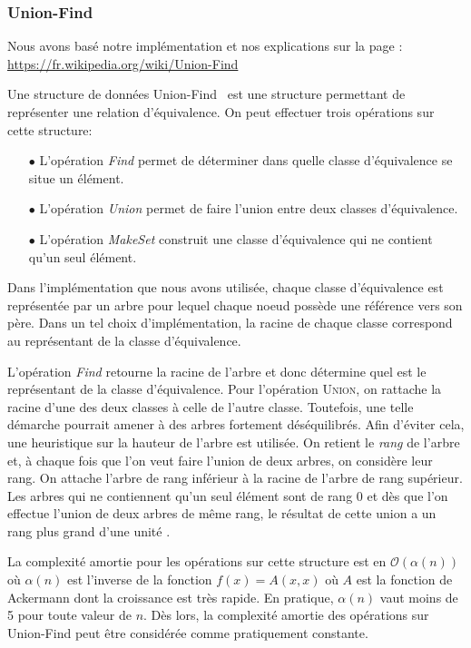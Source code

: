 \subsubsection{Union-Find}
\label{section:unionFind}

Nous avons basé notre implémentation et nos explications sur la page : \url{https://fr.wikipedia.org/wiki/Union-Find}

Une structure de données \og Union-Find \fg~est une structure permettant de représenter une relation d'équivalence. On peut effectuer trois opérations sur cette structure:
\begin{itemize}
\item[$\bullet$] L'opération \emph{Find} permet de déterminer dans quelle classe d'équivalence se situe un élément.
\item[$\bullet$] L'opération \emph{Union} permet de faire l'union entre deux classes d'équivalence.
\item[$\bullet$] L'opération \emph{MakeSet} construit une classe d'équivalence qui ne contient qu'un seul élément.
\end{itemize}

Dans l'implémentation que nous avons utilisée, chaque classe d'équivalence est représentée par un arbre pour lequel chaque noeud possède une référence vers son père. Dans un tel choix d'implémentation, la racine de chaque classe correspond au représentant de la classe d'équivalence.

L'opération \emph{Find} retourne la racine de l'arbre et donc détermine quel est le représentant de la classe d'équivalence. Pour l'opération \textsc{Union}, on rattache la racine d'une des deux classes à celle de l'autre classe. Toutefois, une telle démarche pourrait amener à des arbres fortement déséquilibrés. Afin d'éviter cela, une heuristique sur la hauteur de l'arbre est utilisée. On retient le \emph{rang} de l'arbre et, à chaque fois que l'on veut faire l'union de deux arbres, on considère leur rang. On attache l'arbre de rang inférieur à la racine de l'arbre de rang supérieur. Les arbres qui ne contiennent qu'un seul élément sont de rang 0 et dès que l'on effectue l'union de deux arbres de même rang, le résultat de cette union a un rang plus grand d'une unité .

La complexité amortie pour les opérations sur cette structure  est en $\mathcal{O}(\alpha (n))$ où $\alpha(n)$ est l'inverse de la fonction $f(x) = A(x,x)$ où $A$ est la fonction de Ackermann dont la croissance est très rapide. En pratique, $\alpha(n)$ vaut moins de 5 pour toute valeur de $n$. Dès lors, la complexité amortie des opérations sur Union-Find peut être considérée comme pratiquement constante.


